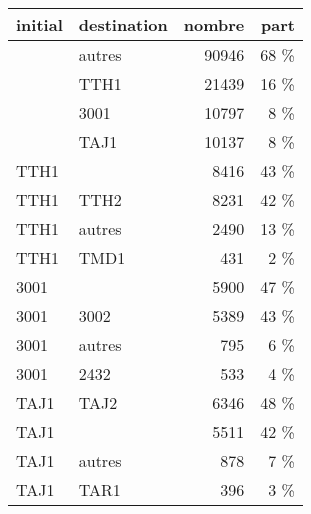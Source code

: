 \begin{tabular}{llrr}
\toprule
initial & destination &  nombre & part \\
\midrule
        &      autres &   90946 & 68 \% \\
        &        TTH1 &   21439 & 16 \% \\
        &        3001 &   10797 &  8 \% \\
        &        TAJ1 &   10137 &  8 \% \\
   TTH1 &             &    8416 & 43 \% \\
   TTH1 &        TTH2 &    8231 & 42 \% \\
   TTH1 &      autres &    2490 & 13 \% \\
   TTH1 &        TMD1 &     431 &  2 \% \\
   3001 &             &    5900 & 47 \% \\
   3001 &        3002 &    5389 & 43 \% \\
   3001 &      autres &     795 &  6 \% \\
   3001 &        2432 &     533 &  4 \% \\
   TAJ1 &        TAJ2 &    6346 & 48 \% \\
   TAJ1 &             &    5511 & 42 \% \\
   TAJ1 &      autres &     878 &  7 \% \\
   TAJ1 &        TAR1 &     396 &  3 \% \\
\bottomrule
\end{tabular}
